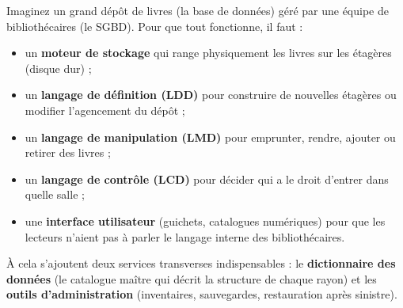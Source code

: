 \documentclass[11pt]{article}
\begin{document}
Imaginez un grand dépôt de livres (la base de données) géré par une équipe de bibliothécaires (le SGBD). Pour que tout fonctionne, il faut :
\begin{itemize}
    \item un \textbf{moteur de stockage} qui range physiquement les livres sur les étagères (disque dur) ;
    \item un \textbf{langage de définition (LDD)} pour construire de nouvelles étagères ou modifier l'agencement du dépôt ;
    \item un \textbf{langage de manipulation (LMD)} pour emprunter, rendre, ajouter ou retirer des livres ;
    \item un \textbf{langage de contrôle (LCD)} pour décider qui a le droit d'entrer dans quelle salle ;
    \item une \textbf{interface utilisateur} (guichets, catalogues numériques) pour que les lecteurs n'aient pas à parler le langage interne des bibliothécaires.
\end{itemize}
À cela s'ajoutent deux services transverses indispensables : le \textbf{dictionnaire des données} (le catalogue maître qui décrit la structure de chaque rayon) et les \textbf{outils d'administration} (inventaires, sauvegardes, restauration après sinistre).
\end{document}
